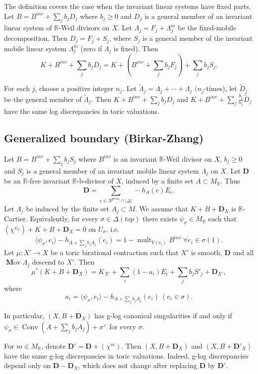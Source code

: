 \documentclass[12pt,twoside]{amsart}
\newcommand{\R}{{\mathbb R}}
\newcommand{\bD}{{\mathbf D}}
\newcommand{\Conv}{\operatorname{Conv}}
\newcommand{\bMov}{\operatorname{{\mathbf Mov}}}
\newcommand{\mult}{\operatorname{mult}}
\theoremstyle{plain}
\theoremstyle{definition}
\theoremstyle{remark}
\begin{document}
The definition covers the case when the invariant linear systems have fixed parts.
Let $B=B^{inv}+\sum_jb_jD_j$ where $b_j\ge 0$ and $D_j$ is a general member of 
an invariant linear system of $\R$-Weil divisors on $X$. 
Let $\Lambda_j=F_j+\Lambda^m_j$ be the fixed-mobile decomposition.
Then $D_j=F_j+S_j$, where $S_j$ is a general member of the invariant mobile
linear system $\Lambda^m_j$ (zero if $\Lambda_j$ is fixed). Then 
$$
K+B^{inv}+\sum_jb_jD_j=K+(B^{inv}+\sum_j b_jF_j)+\sum_j b_jS_j.
$$

For each $j$, choose a positive integer $n_j$. Let 
$\tilde{\Lambda}_j=\Lambda_j+\cdots+\Lambda_j$ $(n_j$-times), let $\tilde{D}_j$
be the general member of $\tilde{\Lambda}_j$. Then 
$K+B^{inv}+\sum_jb_jD_j$ and $K+B^{inv}+\sum_j\frac{b_j}{n_j}\tilde{D}_j$ 
have the same log discrepancies in toric valuations.


\subsection{Generalized boundary (Birkar-Zhang)}


Let $B=B^{inv}+\sum_j b_jS_j$ where
$B^{inv}$ is an invariant $\R$-Weil divisor on $X$, $b_j\ge 0$ and $S_j$ is a general
member of an invariant mobile linear system $\Lambda_j$ on $X$.
Let $\bD$ be an $\R$-free invariant $\R$-b-divisor of $X$,  induced by a finite set
$A\subset M_\R$. Thus 
$$
\bD=\sum_{e\in N^{prim} \cap |\Delta| }-h_A(e)E_e.
$$
Let $\Lambda_j$ be induced by the finite set $A_j\subset M$.
We assume that $K+B+\bD_X$ is $\R$-Cartier. Equivalently, for every 
$\sigma\in \Delta(top)$ there exists $\psi_\sigma\in M_\R$ such that 
$(\chi^{\psi_\sigma})+K+B+\bD_X=0$ on $U_\sigma$, i.e. 
$$
\langle \psi_\sigma,e_i \rangle-h_{A+\sum_j b_jA_j}(e_i)=1-\mult_{V(e_i)}B^{inv}\ \forall e_i\in \sigma(1).
$$
Let $\mu\colon X'\to X$ be a toric birational contraction such that $X'$ is smooth,
$\bD$ and all $\bMov \Lambda_j$ descend to $X'$. Then
$$
\mu^*(K+B+\bD_X)=K_{X'}+\sum_i (1-a_i)E_i+\sum_jb_jS'_j+\bD_{X'},
$$
where 
$$
a_i=\langle \psi_\sigma,e_i\rangle-h_{A+\sum_jb_jA_j}(e_i)\ ( e_i\in \sigma ).
$$

In particular, $(X,B+\bD_X)$ has g-log canonical singularities if and only if 
$\psi_\sigma\in \Conv(A+\sum_j b_jA_j)+\sigma^\vee$ for every $\sigma$.

For $m\in M_\R$, denote $\bD'=\bD+(\chi^m)$. Then 
$(X,B+\bD_X)$ and $(X,B+\bD'_X)$ have the same g-log discrepancies in toric valuations.
Indeed, g-log discrepancies depend only on $\bD-\overline{\bD_X}$, which does not change
after replacing $\bD$ by $\bD'$.
\end{document}
